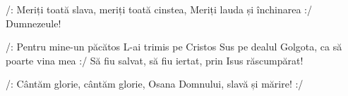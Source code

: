 \beginverse
/: Meriți toată slava, meriți toată cinstea,
Meriți lauda și închinarea :/ Dumnezeule!
\endverse

\beginchorus
/: Pentru mine-un păcătos L-ai trimis pe Cristos
Sus pe dealul Golgota, ca să poarte vina mea :/
Să fiu salvat, să fiu iertat, prin Isus răscumpărat!
\endchorus

\beginverse
/: Cântăm glorie, cântăm glorie,
Osana Domnului, slavă și mărire! :/
\endverse
\endsong